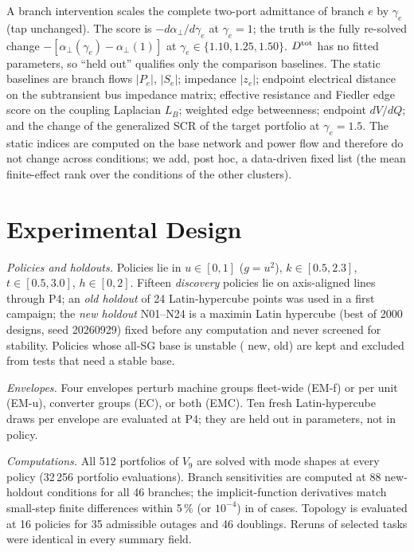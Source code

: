 \documentclass[journal]{IEEEtran}
\theoremstyle{remark}
\newcommand{\aperp}{\alpha_{\perp}}
\newcommand{\Dtot}{D^{\rm tot}}
\begin{document}
A branch intervention scales the complete two-port admittance of branch $e$ by
$\gamma_e$ (tap unchanged). The score is $-d\aperp/d\gamma_e$ at $\gamma_e=1$; the
truth is the fully re-solved change $-[\aperp(\gamma_e)-\aperp(1)]$ at
$\gamma_e\in\{1.10,1.25,1.50\}$. $\Dtot$ has no fitted parameters, so ``held
out'' qualifies only the comparison baselines. The static baselines are branch
flows $|P_e|$, $|S_e|$; impedance $|z_e|$; endpoint electrical distance on the
subtransient bus impedance matrix; effective resistance and Fiedler edge score on
the coupling Laplacian $L_B$; weighted edge betweenness; endpoint $dV/dQ$; and
the change of the generalized SCR of the target portfolio at $\gamma_e=1.5$. The
static indices are computed on the base network and power flow and therefore do
not change across conditions; we add, post hoc, a data-driven fixed list (the
mean finite-effect rank over the conditions of the other clusters).

\section{Experimental Design}\label{sec:design}

\emph{Policies and holdouts.} Policies lie in $u\in[0,1]$ ($g=u^2$),
$k\in[0.5,2.3]$, $t\in[0.5,3.0]$, $h\in[0,2]$. Fifteen \emph{discovery}
policies lie on axis-aligned lines through P4; an \emph{old holdout} of 24
Latin-hypercube points was used in a first campaign; the \emph{new holdout}
N01--N24 is a maximin Latin hypercube (best of 2000 designs, seed 20260929) fixed
before any computation and never screened for stability. Policies whose all-SG
base is unstable (\nNewUnstable{} new, \nOldUnstable{} old) are kept and excluded
from tests that need a stable base.

\emph{Envelopes.} Four envelopes perturb machine groups fleet-wide (EM-f) or
per unit (EM-u), converter groups (EC), or both (EMC). Ten fresh
Latin-hypercube draws per envelope are evaluated at P4; they are held out in
parameters, not in policy.

\emph{Computations.} All 512 portfolios of $V_9$ are solved with mode shapes at
every policy (32\,256 portfolio evaluations). Branch sensitivities are computed
at 88 new-holdout conditions for all 46 branches; the implicit-function
derivatives match small-step finite differences within 5\,\% (or $10^{-4}$) in
\ivLinks{} of \ivN{} cases. Topology is evaluated at 16 policies for 35
admissible outages and 46 doublings. Reruns of selected tasks were identical in
every summary field.
\end{document}
